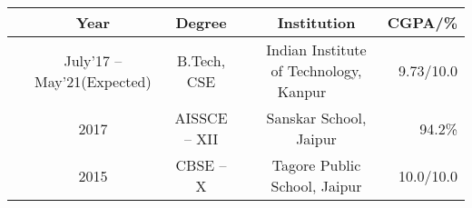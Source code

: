 
\newcommand{\education}[4]{
  & #1 & #2 & &#3 & #4
}
{
\fontsize{10pt}{1em}\selectfont
\begin{tabular}{ | L{0.05cm} c | c | L{0.2cm} c | r |}
  \hline
  \rule{0pt}{1.1\normalbaselineskip}
  \education{\textbf{Year}}{\textbf{Degree}}{\textbf{Institution}}{\textbf{CGPA/\%}}\\
  \hline
  \rule{0pt}{1.1\normalbaselineskip}
  \education{July'17 -- May'21(Expected)}{B.Tech, CSE}{Indian Institute of Technology, Kanpur~~~~}{9.73/10.0}\\
  \rule{0pt}{1.1\normalbaselineskip}
  \education{2017}{AISSCE -- XII}{Sanskar School, Jaipur}{94.2\%}\\
  \rule{0pt}{1.1\normalbaselineskip}
  \education{2015}{CBSE -- X}{Tagore Public School, Jaipur}{10.0/10.0}\\
  \hline
\end{tabular}

}
